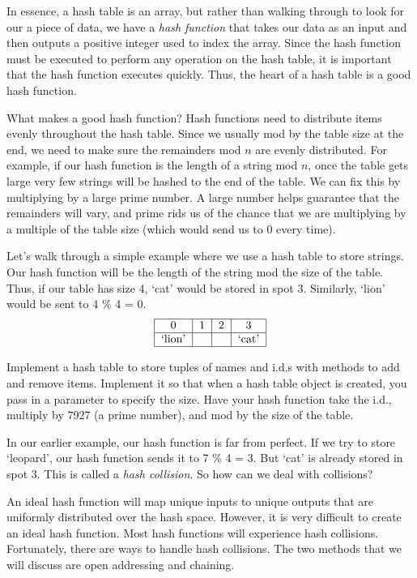 In essence, a hash table is an array, but rather than walking through to look for our a piece of data, we have a \emph{hash function} that takes our data as an input and then outputs a positive integer used to index the array.
Since the hash function must be executed to perform any operation on the hash table, it is important that the hash function executes quickly.
Thus, the heart of a hash table is a good hash function.

What makes a good hash function?
Hash functions need to distribute items evenly throughout the hash table.
Since we usually mod by the table size at the end, we need to make sure the remainders mod $n$ are evenly distributed.
For example, if our hash function is the length of a string mod $n$, once the table gets large very few strings will be hashed to the end of the table.
We can fix this by multiplying by a large prime number.
A large number helps guarantee that the remainders will vary, and prime rids us of the chance that we are multiplying by a multiple of the table size (which would send us to 0 every time).

Let's walk through a simple example where we use a hash table to store strings.
Our hash function will be the length of the string mod the size of the table.
Thus, if our table has size 4, `cat' would be stored in spot 3.
Similarly, `lion' would be sent to 4 \% 4 = 0.
\[
\begin{tabular}{|c|c|c|c|}
\hline
0 & 1 & 2 & 3\\
\hline
`lion' & & & `cat' \\
\hline
\end{tabular}
\]


\begin{problem}
Implement a hash table to store tuples of names and i.d.s with methods to add and remove items.
Implement it so that when a hash table object is created, you pass in a parameter to specify the size.
Have your hash function take the i.d., multiply by 7927 (a prime number), and mod by the size of the table.
\label{prob:Hash1}
\end{problem}

In our earlier example, our hash function is far from perfect.
If we try to store `leopard', our hash function sends it to 7 \% 4 = 3.
But `cat' is already stored in spot 3.
This is called a \emph{hash collision}.
So how can we deal with collisions?

An ideal hash function will map unique inputs to unique outputs that are uniformly distributed over the hash space.
However, it is very difficult to create an ideal hash function.
Most hash functions will experience hash collisions.
Fortunately, there are ways to handle hash collisions.
The two methods that we will discuss are open addressing and chaining.

